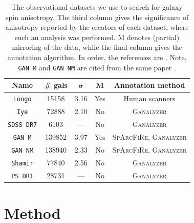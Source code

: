 \documentclass[fleqn,usenatbib,nofootinbib]{mnras}
\begin{document}
\begin{table}
\centering
\caption{The observational datasets we use to search for galaxy spin anisotropy. The third column gives the significance of anisotropy reported by the creators of each dataset, where such an analysis was performed. M denotes (partial) mirroring of the data, while the final column gives the annotation algorithm.
In order, the references are \citet{Longo, 2021ApJ...907..123I, 2022PASJ...74.1114S, McAdam_Shamir_2023_SDSS_DR7, McAdam_Shamir_2023_GAN, Shamir_2021, 2017PASA...34...44S}. Note, \texttt{GAN M} and \texttt{GAN NM} are cited from the same paper \citep{McAdam_Shamir_2023_GAN}.}
\begin{tabular}{|c|c|c|c|c|}
\hline
\textbf{Name} & \textbf{\# gals} & $\mathbf{\sigma}$ & $\mathbf{M}$ & \textbf{Annotation method} \\
\hline
\texttt{Longo} & 15158 & 3.16 & Yes & Human scanners \\
\texttt{Iye} & 72888 & 2.10 & No & \textsc{Ganalyzer} \\
\texttt{SDSS DR7} & 6103 & --- & No & \textsc{Ganalyzer} \\
\texttt{GAN M} & 139852 & 3.97 & Yes & \textsc{SpArcFiRe}, \textsc{Ganalyzer} \\
\texttt{GAN NM} & 138940 & 2.33 & No & \textsc{SpArcFiRe}, \textsc{Ganalyzer} \\
\texttt{Shamir} & 77840 & 2.56 & No & \textsc{Ganalyzer} \\
\texttt{PS DR1} & 28731 & --- & No & \textsc{Ganalyzer} \\
\hline
\end{tabular}
\label{Table 1}
\end{table}

\section{Method}
\label{sec:method}
\end{document}
